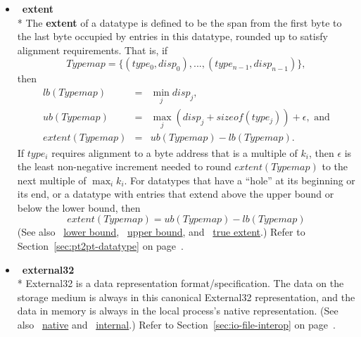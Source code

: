 \begin{itemize}
\label{glossary:extent}
\item  ~\hypertarget{glossary:extent}{\textbf{extent}} \\*
The {\bf extent} of a datatype is defined to
be the span from the first byte to the last byte occupied by entries in this
datatype, rounded up to satisfy alignment requirements.
That is, if
\[
Typemap = \{ (type_0,disp_0), ..., (type_{n-1}, disp_{n-1}) \} ,
\]
then
\begin{eqnarray}
lb(Typemap) & = & \min_j disp_j , \nonumber \\
ub(Typemap) & = & \max_j (disp_j + sizeof(type_j)) + \epsilon , \mbox{ and}
\nonumber \\ extent(Typemap) & = & ub(Typemap) -lb(Typemap).
\end{eqnarray}
If $type_i$ requires alignment to a byte address that 
is
a multiple
of $k_i$,
then $\epsilon$ is the least non-negative increment needed to round
$extent(Typemap)$ to the next multiple of $\max_i k_i$.
For datatypes that 
have a ``hole'' at its beginning or its end, or a datatype with
entries that extend above the upper bound or below the lower bound, then
\label{eq:pt2pt-extent}
\[
extent(Typemap) = ub(Typemap) - lb(Typemap)
\]
(See also ~\hyperlink{glossary:lower_bound}{lower bound}, ~\hyperlink{glossary:upper_bound}{upper bound}, and ~\hyperlink{glossary:true_extent}{true extent}.)
Refer to Section~\ref{sec:pt2pt-datatype} on page~\pageref{sec:pt2pt-datatype}.

\label{glossary:external32}
\item  ~\hypertarget{glossary:external32}{\textbf{external32}} \\*
External32 is a data representation format/specification.
The data on the storage
medium is always in this canonical External32 representation, and
the data in memory
is always in the local process's native representation.
(See also ~\hyperlink{glossary:native}{native} and ~\hyperlink{glossary:internal}{internal}.)
Refer to Section~\ref{sec:io-file-interop} on page~\pageref{sec:io-file-interop}.


\end{itemize}
